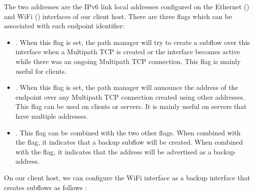\documentclass[letterpaper,10pt,english]{sphinxmanual}
\begin{document}
\begin{sphinxVerbatim}[commandchars=\\\{\}]
\end{sphinxVerbatim}

\sphinxAtStartPar
The two  addresses are the IPv6 link local addresses configured on the Ethernet () and Wi\sphinxhyphen{}Fi () interfaces of our client host. There are three flags which can be associated with each endpoint identifier:
\begin{itemize}
\item {} 
\sphinxAtStartPar
{}. When this flag is set, the path manager will try to create a subflow over this interface when a Multipath TCP is created or the interface becomes active while there was an ongoing Multipath TCP connection. This flag is mainly useful for clients.

\item {} 
\sphinxAtStartPar
{}. When this flag is set, the path manager will announce the address of the endpoint over any Multipath TCP connection created using other addresses. This flag can be used on clients or servers. It is mainly useful on servers that have multiple addresses.

\item {} 
\sphinxAtStartPar
{}. This flag can be combined with the two other flags. When combined with the  flag, it indicates that a backup subflow will be created. When combined with the  flag, it indicates that the address will be advertised as a backup address.

\end{itemize}

\sphinxAtStartPar
On our client host, we can configure the Wi\sphinxhyphen{}Fi interface as a backup interface that creates subflows as follows :

\begin{sphinxVerbatim}[commandchars=\\\{\}]
\end{sphinxVerbatim}
\end{document}
